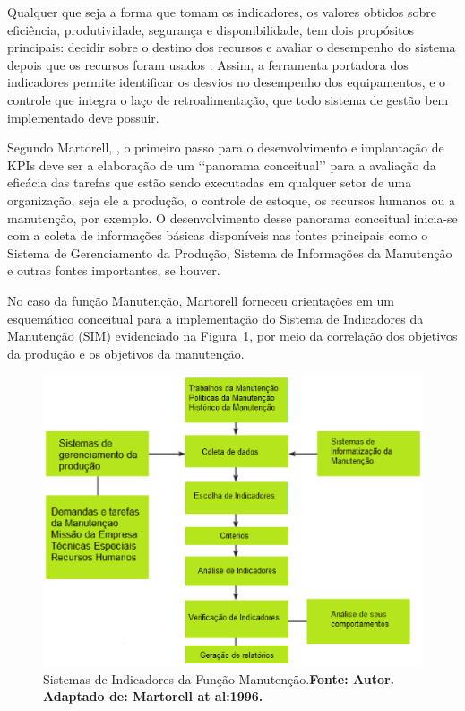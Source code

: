 Qualquer que seja a forma que tomam os indicadores, os valores obtidos sobre eficiência, produtividade, segurança e disponibilidade, tem dois propósitos principais: decidir sobre o destino dos recursos e avaliar o desempenho do sistema depois que os recursos foram usados \cite{lofsten1998}. Assim, a ferramenta portadora dos indicadores permite identificar os desvios no desempenho dos equipamentos, e o controle que integra o laço de retroalimentação, que todo sistema de gestão bem implementado deve possuir. 

Segundo Martorell, \cite{martorell1999}, o primeiro passo para o desenvolvimento e implantação de KPIs deve ser a elaboração de um {\lq\lq panorama conceitual\rq\rq} para a avaliação da eficácia das tarefas que estão sendo executadas em qualquer setor de uma organização, seja ele a produção, o controle de estoque, os recursos humanos ou a manutenção, por exemplo. O desenvolvimento desse panorama conceitual inicia-se com a coleta de informações básicas disponíveis nas fontes principais como o Sistema de Gerenciamento da Produção, Sistema de Informações da Manutenção e outras fontes importantes, se houver.

No caso da função Manutenção, Martorell forneceu orientações em um esquemático conceitual para a implementação do Sistema de Indicadores da Manutenção (SIM) evidenciado na Figura~\ref{Sistemas de Indicadores da Manutencao}, por meio da correlação dos objetivos da produção e os objetivos da manutenção.

\graphicspath{{figuras/}}
\begin{figure}[H]
\centering
\includegraphics[width=1\textwidth]{Sistemas_de_Indicadores_da_Manuten_o.eps}
\caption{Sistemas de Indicadores da Função Manutenção.\textbf{Fonte: Autor. Adaptado de: Martorell at al:1996.}}
\label{Sistemas de Indicadores da Manutencao}
\end{figure}

